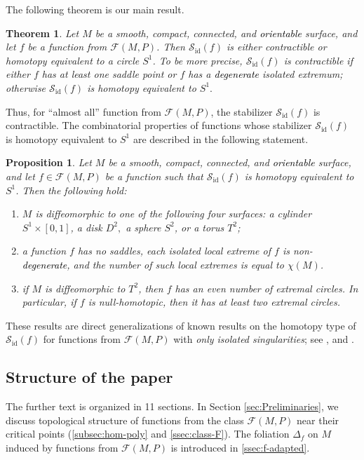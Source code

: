 \documentclass[10pt,reqno]{amsart}
\newtheorem{proposition}[subsection]{Proposition}
\newtheorem{theorem}[subsection]{Theorem}
\newcommand{\Sid}{\mathcal{S}_{\id}(f)}
\newcommand{\F}{\mathcal{F}(M,P)}
\newcommand{\id}{\mathrm{id}}
\newcommand{\textr}[1]{\textcolor{black}{#1}}
\begin{document}
The following theorem is our main result.
\begin{theorem}\label{thm:main-theorem}
	Let $M$ be a smooth, compact, connected, and \textr{orientable} surface, and let $f$ be a function from $\F$. 
Then $\Sid$ is either contractible or homotopy equivalent to a circle $S^1$. To be more precise, 
$\Sid$ is contractible if either $f$ has at least one  saddle point or $f$ has a \textr{degenerate} isolated extremum; otherwise $\Sid$ is homotopy equivalent to $S^1.$
\end{theorem}
 Thus, for ``almost all'' function from $\F$, the stabilizer $\Sid$ is contractible.
 The combinatorial properties of  functions whose stabilizer $\Sid$ is homotopy equivalent to  $S^1$ are described in the following statement.
\begin{proposition}\label{prop:main}
	Let $M$ be a smooth, compact, connected, and \textr{orientable} surface, and let $f\in \F$ be a function such that $\Sid$ is homotopy equivalent to $S^1$. Then the following  hold:
	\begin{enumerate}
		\item    $M$ is diffeomorphic to  one of the following four surfaces: a cylinder $S^1\times [0,1]$, a disk $D^2,$ a sphere $S^2$, or a torus $T^2$; 
		\item a function $f$ has no saddles, each isolated local extreme of $f$ is non-\textr{degenerate}, and the number of such local extremes is equal to $\chi(M)$.
		\item  if $M$ is diffeomorphic to $T^2$, then $f$ has  an even number of extremal circles. In particular, if $f$ is null-homotopic, then it has at least two extremal  circles.
	\end{enumerate}
\end{proposition}


These results are  direct generalizations of known results on the homotopy type of $\Sid$ for functions from $\F$ with {\it  only isolated singularities}; see   \cite[Theorem 3.7]{Maksymenko:OsakaJM:2011}, and  \cite[Theorem 1.3]{Maksymenko:AGAG:2006}. 




\subsection{Structure of the paper}
The further text is organized in 11 sections.
In Section \ref{sec:Preliminaries},  we discuss  topological structure of functions from the class $\F$ near their critical points (\textsection \ref{subsec:hom-poly} and \ref{ssec:class-F}).
The foliation $\Delta_f$ on $M$ induced by functions from $\F$ is introduced in \textsection \ref{ssec:f-adapted}. 
\end{document}
